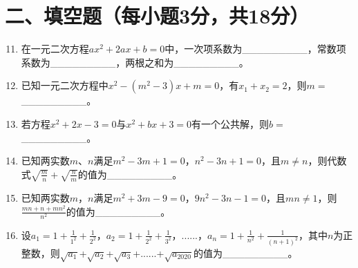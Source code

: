 \documentclass[10pt]{article}
\newcommand{\complitingline}{\_\_\_\_\_\_\_\_\_}
\begin{document}
\section*{\normalsize 二、填空题（每小题3分，共18分）}
\begin{enumerate}\setcounter{enumi}{10}
    \item 在一元二次方程$ax^{2} + 2ax + b = 0$中，一次项系数为\complitingline{}，常数项系数为\complitingline{}，两根之和为\complitingline{}。
    \item 已知一元二次方程中$x^{2} - ( m^{2} - 3 )x + m = 0$，有$x_{1} + x_{2} = 2$，则$m =$\complitingline{}。
    \item 若方程$x^{2} + 2x - 3 = 0$与$x^{2} + bx + 3 = 0$有一个公共解，则$b =$\complitingline{}。
    \item 已知两实数$m$、$n$满足$m^2-3m+1=0$，$n^2-3n+1=0$，且$m \neq n$，则代数式$\sqrt{\frac{m}{n}}+\sqrt{\frac{n}{m}}$的值为\complitingline{}。
    \item 已知两实数$m$，$n$满足$m^2+3m-9=0$，$9n^2-3n-1=0$，且$mn \neq 1$，则$\frac{mn+n+mn^{2}}{n^{2}}$的值为\complitingline{}。
    \item 设$a_{1} = 1 + \frac{1}{1^{2}} + \frac{1}{2^{2}} $，$ a_{2} = 1 + \frac{1}{2^{2}} + \frac{1}{3^{2}}   $，......，$a_{n} = 1 + \frac{1}{n^{2}} + \frac{1}{(n + 1)^{2}}$，其中$n$为正整数，则$\sqrt{a_{1}}$+$\sqrt{a_{2}}$+$\sqrt{a_{3}}$+......+$\sqrt{a_{2020}}$的值为\complitingline{}。
\end{enumerate}
\end{document}
